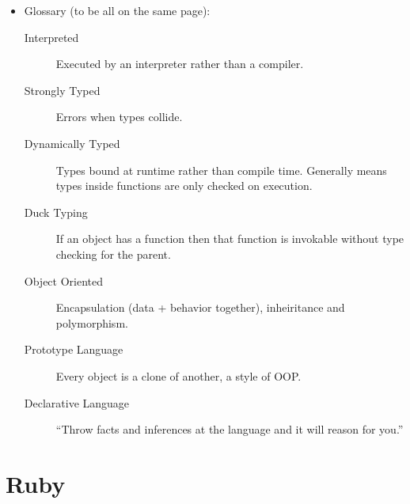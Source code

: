 \documentclass[10pt, twocolumn, landscape]{article}
\begin{document}
\begin{itemize}
    \item Glossary (to be all on the same page):
        \begin{description}
            \item[Interpreted] Executed by an interpreter rather than a
                compiler.
            \item[Strongly Typed] Errors when types collide.
            \item[Dynamically Typed] Types bound at runtime rather than compile
                time. Generally means types inside functions are only checked on
                execution.
            \item[Duck Typing] If an object has a function then that function is
                invokable without type checking for the parent.
            \item[Object Oriented] Encapsulation (data + behavior together),
                inheiritance and polymorphism.
            \item[Prototype Language] Every object is a clone of another, a
                style of OOP.\@
            \item[Declarative Language] ``Throw facts and inferences at the
                language and it will reason for you.''
        \end{description}
\end{itemize}

\section{Ruby}
\end{document}
